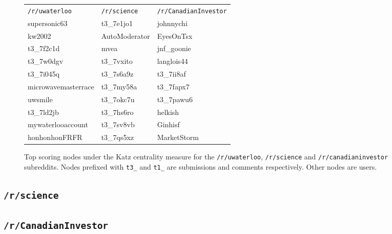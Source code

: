 \documentclass[letterpaper, 10 pt, conference]{ieeeconf}
\theoremstyle{definition}
\begin{document}
\begin{figure*}
  \centering
  \begin{tabular}{l|l|l}
    \texttt{/r/uwaterloo}   & \texttt{/r/science} & \texttt{/r/CanadianInvestor} \\ \hhline{=|=|=}
    supersonic63            & t3\_7e1jo1          & johnnychi \\ \hline
    kw2002                  & AutoModerator       & EyesOnTsx\\ \hline
    t3\_7f2c1d              & mvea                & jnf\_goonie\\ \hline
    t3\_7w0dgv              & t3\_7vxito          & langlois44\\ \hline
    t3\_7i045q              & t3\_7s6a9z          & t3\_7ii8af\\ \hline
    microwavemasterrace     & t3\_7my58a          & t3\_7fapx7\\ \hline
    uwsmile                 & t3\_7okc7u          & t3\_7pawu6\\ \hline
    t3\_7ld2jb              & t3\_7hs6ro          & helkish\\ \hline
    mywaterlooaccount       & t3\_7sv8vb          & Ginhisf\\ \hline
    honhonhonFRFR           & t3\_7qs5xz          & MarketStorm
  \end{tabular}
  \caption{Top scoring nodes under the Katz centrality measure for the \texttt{/r/uwaterloo}, \texttt{/r/science} and \texttt{/r/canadianinvestor} subreddits. Nodes prefixed with \texttt{t3\_} and \texttt{t1\_} are submissions and comments respectively. Other nodes are users.}
  \label{fig:analysis:katz-table}
\end{figure*}

\subsection{\texttt{/r/science}}

\subsection{\texttt{/r/CanadianInvestor}}


\end{document}
